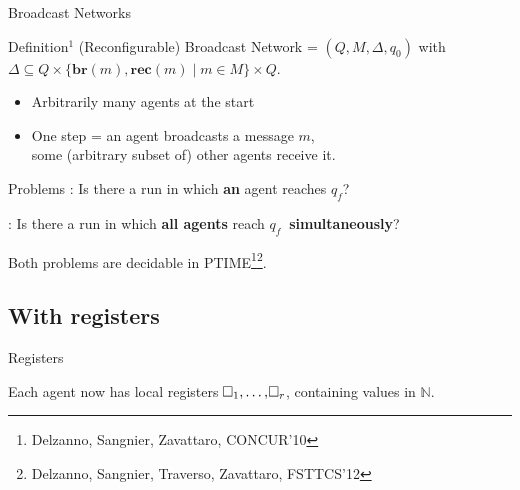 \documentclass{beamer}
\newcommand{\reg}{\hspace{-0.5mm}\square}
\begin{document}
\begin{frame}{Broadcast Networks}
	\begin{block}{Definition$^1$}
		(Reconfigurable) Broadcast Network = $(Q, M, \Delta, q_0)$ with $\Delta \subseteq Q\times \{\mathbf{br}(m), \mathbf{rec}(m) \mid m \in M\} \times Q$.
	\end{block}
	
	\pause
	
	\begin{itemize}
		\item Arbitrarily many agents at the start
		
		\item One step = an agent broadcasts a message $m$,\\ some (arbitrary subset of) other agents receive it.
	\end{itemize}
	
	\pause 
	
	\begin{block}{Problems}
		{}: Is there a run in which \textbf{an} agent reaches \color{blue!60}$q_f$\color{black}?
		
		{}: Is there a run in which \textbf{all agents} reach \color{blue!60}$q_f~$\color{black} \textbf{simultaneously}?
	\end{block}
	
	Both problems are decidable in PTIME\footnote{Delzanno, Sangnier, Zavattaro, CONCUR'10}\footnote{Delzanno, Sangnier, Traverso, Zavattaro, FSTTCS'12}.
\end{frame}

\subsection{With registers}

\begin{frame}
	\tableofcontents[currentsubsection]
\end{frame}

\begin{frame}{Registers}
	
	Each agent now has local registers $\reg_1, \ldots, \reg_r$, containing values in $\mathbb{N}$.\vspace{0.3cm}\pause
	
	
\end{frame}
\end{document}
